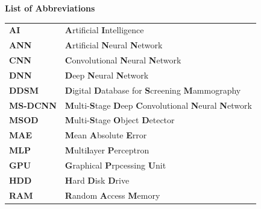 \documentclass[12pt]{extarticle}
\begin{document}
	\newpage
	\LARGE{\textbf{List of Abbreviations}}\\ \vspace{1cm}
	\begin{center}
		\begin{tabular}{l l}
			\multicolumn{1}{p{3cm}}{\large{\textbf{AI}}} &  \multicolumn{1}{p{8cm}}{\large{\textbf{A}rtificial \textbf{I}ntelligence}} \\
			\multicolumn{1}{p{3cm}}{\large{\textbf{ANN}}} &  \multicolumn{1}{p{8cm}}{\large{\textbf{A}rtificial \textbf{N}eural \textbf{N}etwork}} \\
			\multicolumn{1}{p{3cm}}{\large{\textbf{CNN}}} &  \multicolumn{1}{p{8cm}}{\large{\textbf{C}onvolutional \textbf{N}eural \textbf{N}etwork}}\\ 
			\multicolumn{1}{p{3cm}}{\large{\textbf{DNN}}} &  \multicolumn{1}{p{8cm}}{\large{\textbf{D}eep \textbf{N}eural \textbf{N}etwork}} \\
			\multicolumn{1}{p{3cm}}{\large{\textbf{DDSM}}} &  \multicolumn{1}{p{8cm}}{\large{\textbf{D}igital \textbf{D}atabase for \textbf{S}creening \textbf{M}ammography}} \\
			\multicolumn{1}{p{3cm}}{\large{\textbf{MS-DCNN}}} &  \multicolumn{1}{p{8cm}}{\large{\textbf{M}ulti-\textbf{S}tage \textbf{D}eep \textbf{C}onvolutional \textbf{N}eural \textbf{N}etwork}}\\ 
			\multicolumn{1}{p{3cm}}{\large{\textbf{MSOD}}} &  \multicolumn{1}{p{8cm}}{\large{\textbf{M}ulti-\textbf{S}tage \textbf{O}bject \textbf{D}etector}}\\ 
			\multicolumn{1}{p{3cm}}{\large{\textbf{MAE}}} &  \multicolumn{1}{p{8cm}}{\large{\textbf{M}ean \textbf{A}bsolute \textbf{E}rror}}\\  
			\multicolumn{1}{p{3cm}}{\large{\textbf{MLP}}} &  \multicolumn{1}{p{8cm}}{\large{\textbf{M}ulti\textbf{l}ayer \textbf{P}erceptron}}\\ 
			\multicolumn{1}{p{3cm}}{\large{\textbf{GPU}}} &  \multicolumn{1}{p{8cm}}{\large{\textbf{G}raphical \textbf{P}rpcessing \textbf{U}nit}}\\ 
			\multicolumn{1}{p{3cm}}{\large{\textbf{HDD}}} &  \multicolumn{1}{p{8cm}}{\large{\textbf{H}ard \textbf{D}isk \textbf{D}rive}}\\ 
			\multicolumn{1}{p{3cm}}{\large{\textbf{RAM}}} &  \multicolumn{1}{p{8cm}}{\large{\textbf{R}andom \textbf{A}ccess \textbf{M}emory}}
			 
		\end{tabular}
	\end{center}
\end{document}

